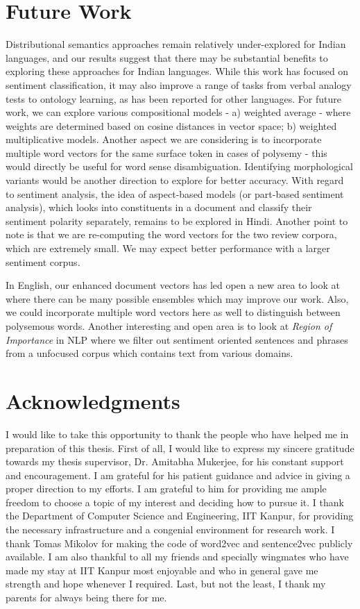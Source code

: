 \documentclass[11pt,a4paper]{article}
\begin{document}
\section{Future Work}
\label{sec:future_work}
Distributional semantics approaches remain relatively under-explored for Indian languages, and our results suggest that there may be substantial benefits to exploring these approaches for Indian languages.  While this work has focused on sentiment classification, it may also improve a range of tasks from verbal analogy tests to ontology learning, as has been reported for other languages.
For future work, we can explore various compositional models - a) weighted average - where weights are determined based on cosine distances in vector space;  b) weighted multiplicative models. Another aspect we are considering is to incorporate multiple word vectors for the same surface token in cases of polysemy - this would directly be useful for word sense disambiguation.  Identifying morphological variants would be another direction to explore for better accuracy. With regard to sentiment analysis, the idea of aspect-based models (or part-based sentiment analysis), which looks into constituents in a document and classify their sentiment polarity separately, remains to be explored in Hindi. Another point to note is that we are re-computing the word vectors for the two review corpora, which are extremely small.  We may expect better performance  with a larger sentiment corpus.

In English, our enhanced document vectors has led open a new area to look at where there can be many possible ensembles which may improve our work. Also, we could incorporate multiple word vectors here as well to distinguish between polysemous words. Another interesting and open area is to look at \emph{Region of Importance} in NLP where we filter out sentiment oriented sentences and phrases from a unfocused corpus which contains text from various domains.

\section*{Acknowledgments}

I would like to take this opportunity to thank the people who have helped me in preparation of this thesis.
First of all, I would like to express my sincere gratitude towards my thesis supervisor, Dr. Amitabha Mukerjee, for his  constant support and encouragement. I am grateful for his patient guidance and advice in giving a proper direction to my efforts. I am grateful to him for providing me ample freedom to choose a topic of my interest and deciding how to pursue it.
I thank the Department of Computer Science and Engineering, IIT Kanpur, for providing the necessary infrastructure and a congenial environment for research work. I thank Tomas Mikolov for making the code of word2vec and sentence2vec publicly available.
I am also thankful to all my friends and specially wingmates who have made my stay at IIT Kanpur most enjoyable and who in general gave me strength and hope whenever I required.
Last, but not the least, I thank my parents for always being there for me.



\end{document}

